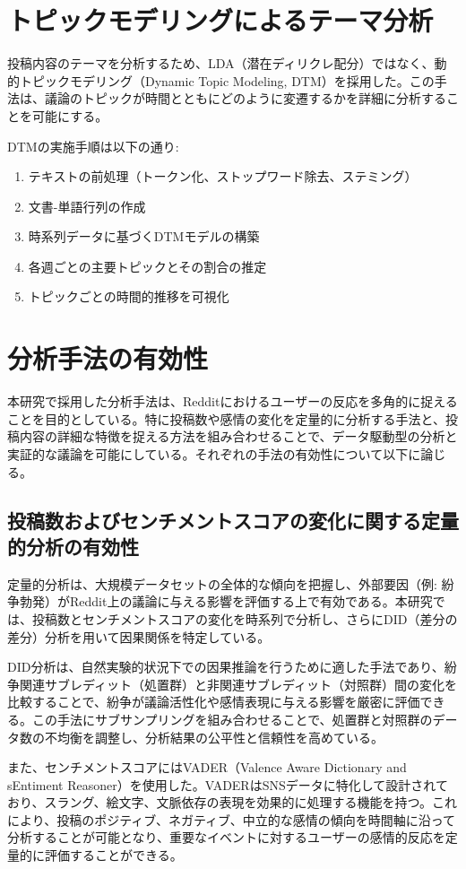 \documentclass[11pt, a4j]{jreport}
\begin{document}
    \section{トピックモデリングによるテーマ分析}
    投稿内容のテーマを分析するため、LDA（潜在ディリクレ配分）ではなく、動的トピックモデリング（Dynamic Topic Modeling, DTM）を採用した。この手法は、議論のトピックが時間とともにどのように変遷するかを詳細に分析することを可能にする。

    DTMの実施手順は以下の通り:
    \begin{enumerate}
        \item テキストの前処理（トークン化、ストップワード除去、ステミング）
        \item 文書-単語行列の作成
        \item 時系列データに基づくDTMモデルの構築
        \item 各週ごとの主要トピックとその割合の推定
        \item トピックごとの時間的推移を可視化
    \end{enumerate}

    \section{分析手法の有効性}
    本研究で採用した分析手法は、Redditにおけるユーザーの反応を多角的に捉えることを目的としている。特に投稿数や感情の変化を定量的に分析する手法と、投稿内容の詳細な特徴を捉える方法を組み合わせることで、データ駆動型の分析と実証的な議論を可能にしている。それぞれの手法の有効性について以下に論じる。

    \subsection{投稿数およびセンチメントスコアの変化に関する定量的分析の有効性}
    定量的分析は、大規模データセットの全体的な傾向を把握し、外部要因（例: 紛争勃発）がReddit上の議論に与える影響を評価する上で有効である。本研究では、投稿数とセンチメントスコアの変化を時系列で分析し、さらにDID（差分の差分）分析を用いて因果関係を特定している。

    DID分析は、自然実験的状況下での因果推論を行うために適した手法であり、紛争関連サブレディット（処置群）と非関連サブレディット（対照群）間の変化を比較することで、紛争が議論活性化や感情表現に与える影響を厳密に評価できる。この手法にサブサンプリングを組み合わせることで、処置群と対照群のデータ数の不均衡を調整し、分析結果の公平性と信頼性を高めている。

    また、センチメントスコアにはVADER（Valence Aware Dictionary and sEntiment Reasoner）を使用した。VADERはSNSデータに特化して設計されており、スラング、絵文字、文脈依存の表現を効果的に処理する機能を持つ。これにより、投稿のポジティブ、ネガティブ、中立的な感情の傾向を時間軸に沿って分析することが可能となり、重要なイベントに対するユーザーの感情的反応を定量的に評価することができる。
\end{document}
